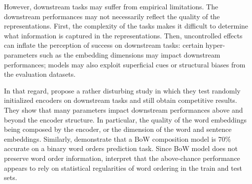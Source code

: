 However, downstream tasks may suffer from empirical limitations. The downstream performances may not necessarily reflect the quality of the representations. First, the complexity of the tasks makes it difficult to determine what information is captured in the representations. Then, uncontrolled effects can inflate the perception of success on downstream tasks: certain hyper-parameters such as the embedding dimensions may impact downstream performances; models may also exploit superficial cues or structural biases from the evaluation datasets.

In that regard, \textcite{wieting_19} propose a rather disturbing study in which they test randomly initialized encoders on downstream tasks and still obtain competitive results. They show that many parameters impact downstream performances above and beyond the encoder structure. In particular, the quality of the word embeddings being composed by the encoder, or the dimension of the word and sentence embeddings. Similarly, \textcite{adi_17} demonstrate that a BoW composition model is 70\% accurate on a binary word orders prediction task. Since BoW model does not preserve word order information, \textcite{ettinger_18} interpret that the above-chance performance appears to rely on statistical regularities of word ordering in the train and test sets.

